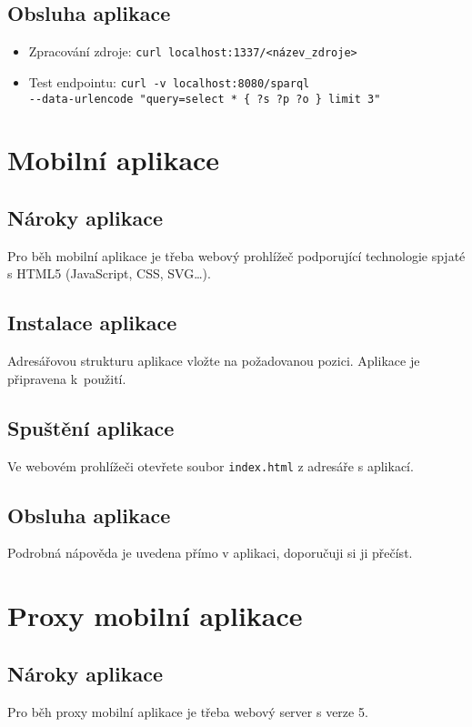 \subsection{Obsluha aplikace}
\begin{itemize}
 \item Zpracování zdroje: \texttt{curl localhost:1337/<název\_zdroje>}
 \item Test  endpointu: \texttt{curl -v localhost:8080/sparql \\ -{}-data-urlencode "query=select * \{ ?s ?p ?o \} limit 3"}
\end{itemize}

\section{Mobilní aplikace}
\subsection{Nároky aplikace}
Pro běh mobilní aplikace je třeba webový prohlížeč podporující technologie spjaté s HTML5 (JavaScript, CSS, SVG\dots).

\subsection{Instalace aplikace}
Adresářovou strukturu aplikace vložte na požadovanou pozici. Aplikace je připravena k~použití.

\subsection{Spuštění aplikace}
Ve webovém prohlížeči otevřete soubor \texttt{index.html} z adresáře s aplikací.

\subsection{Obsluha aplikace}
Podrobná nápověda je uvedena přímo v aplikaci, doporučuji si ji přečíst.

\section{Proxy mobilní aplikace}
\subsection{Nároky aplikace}
Pro běh proxy mobilní aplikace je třeba webový server s  verze 5.

